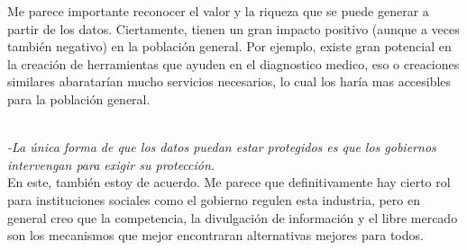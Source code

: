 \documentclass[12pt,a4paper]{article}
\begin{document}
\begin{enumerate}
\begin{enumerate}
				Me parece importante reconocer el valor y la riqueza que se puede generar a partir de los datos. Ciertamente, tienen un gran impacto positivo (aunque a veces también negativo) en la población general.
Por ejemplo, existe gran potencial en la creación de herramientas que ayuden en el diagnostico medico, eso o creaciones similares abaratarían mucho servicios necesarios, lo cual los haría mas accesibles para la población general.

\\

				\textit {-La única forma de que los datos puedan estar
protegidos es que los gobiernos intervengan
para exigir su protección.} \\

			En este, también estoy de acuerdo. Me parece que definitivamente hay cierto rol para instituciones sociales como el gobierno regulen esta industria, pero en general creo que la competencia, la divulgación de información y el libre mercado son los mecanismos que mejor encontraran alternativas mejores para todos.

				
		\end{enumerate}

\end{enumerate}
\end{document}
